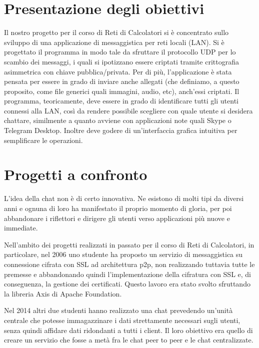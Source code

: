\section{Presentazione degli obiettivi}
Il nostro progetto per il corso di Reti di Calcolatori si è concentrato sullo sviluppo
di una applicazione di messaggistica per reti locali (LAN).
Si è progettato il programma in modo tale da
sfruttare il protocollo UDP per lo scambio dei messaggi, i quali si ipotizzano essere criptati tramite
crittografia asimmetrica con chiave pubblica/privata. Per di più, l'applicazione
è stata pensata per essere in grado di inviare anche allegati (che definiamo, a questo proposito,
come file generici quali immagini, audio, etc), anch'essi criptati.
Il programma, teoricamente, deve essere in grado di identificare tutti gli utenti connessi
alla LAN, così da rendere possibile scegliere con quale utente si desidera chattare,
similmente a quanto avviene con applicazioni note quali Skype o Telegram Desktop.
Inoltre deve godere di un'interfaccia grafica intuitiva per semplificare
le operazioni.

\section{Progetti a confronto}
L'idea della chat non è di certo innovativa. Ne esistono di molti tipi da diversi anni e
ognuna di loro ha manifestato il proprio momento di gloria, per poi abbandonare i riflettori
e dirigere gli utenti verso applicazioni più nuove e immediate.

Nell'ambito dei progetti realizzati in passato per il corso di Reti di Calcolatori,
in particolare, nel 2006 uno studente ha proposto un servizio di messaggistica su
connessione cifrata con SSL ad architettura p2p, non realizzando tuttavia tutte le premesse
e abbandonando quindi l'implementazione della cifratura con SSL e, di conseguenza,
la gestione dei certificati. Questo lavoro era stato svolto sfruttando la libreria Axis
di Apache Foundation.

Nel 2014 altri due studenti hanno realizzato una chat prevedendo un'unità centrale che
potesse immagazzinare i dati strettamente necessari sugli utenti, senza quindi affidare dati
ridondanti a tutti i client. Il loro obiettivo era quello di creare un servizio che fosse
a metà fra le chat peer to peer e le chat centralizzate.

\newpage
